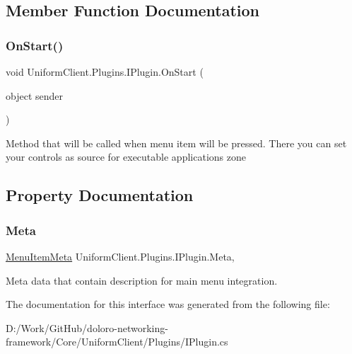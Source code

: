 \subsection{Member Function Documentation}
\mbox{\label{interface_uniform_client_1_1_plugins_1_1_i_plugin_a1ca2220c7ce4a23f8f41af10efccf328}} 
\subsubsection{\texorpdfstring{On\+Start()}{OnStart()}}
{\footnotesize\ttfamily void Uniform\+Client.\+Plugins.\+I\+Plugin.\+On\+Start (\begin{DoxyParamCaption}\item[{object}]{sender }\end{DoxyParamCaption})}



Method that will be called when menu item will be pressed. There you can set your controls as source for executable application\textquotesingle{}s zone 



\subsection{Property Documentation}
\mbox{\label{interface_uniform_client_1_1_plugins_1_1_i_plugin_aa49e267e66a3d697ded460d9281dcc3a}} 
\subsubsection{\texorpdfstring{Meta}{Meta}}
{\footnotesize\ttfamily \mbox{\hyperlink{class_uniform_client_1_1_plugins_1_1_menu_item_meta}{Menu\+Item\+Meta}} Uniform\+Client.\+Plugins.\+I\+Plugin.\+Meta\hspace{0.3cm}{\ttfamily [get]}, {\ttfamily [set]}}



Meta data that contain description for main menu integration. 



The documentation for this interface was generated from the following file\+:\begin{DoxyCompactItemize}
\item 
D\+:/\+Work/\+Git\+Hub/doloro-\/networking-\/framework/\+Core/\+Uniform\+Client/\+Plugins/I\+Plugin.\+cs\end{DoxyCompactItemize}
